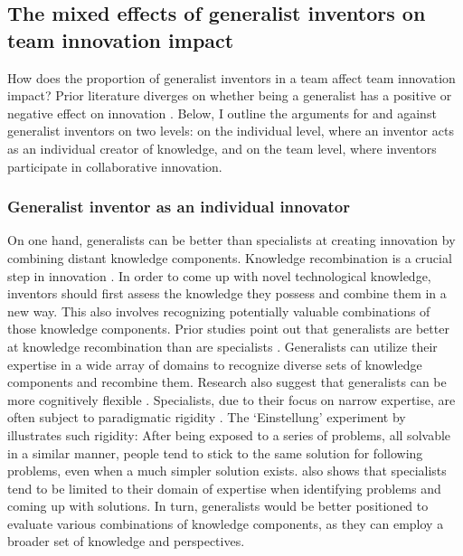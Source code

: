 \documentclass{article}
\begin{document}
\subsection{The mixed effects of generalist inventors on team innovation impact}
How does the proportion of generalist inventors in a team affect team innovation impact? Prior literature diverges on whether being a generalist has a positive or negative effect on innovation \autocite{Nagle2020,Teodoridis2019,Leahey2007,Leahey2017,Boh2014,Dane2010,Conti2014}.
Below, I outline the arguments for and against generalist inventors on two levels: on the individual level, where an inventor acts as an individual creator of knowledge, and on the team level, where inventors participate in collaborative innovation.

\subsubsection{Generalist inventor as an individual innovator}
On one hand, generalists can be better than specialists at creating innovation by combining distant knowledge components. Knowledge recombination is a crucial step in innovation \autocite{Ahuja2001,Hargadon2002}. In order to come up with novel technological knowledge, inventors should first assess the knowledge they possess and combine them in a new way. This also involves recognizing potentially valuable combinations of those knowledge components.
Prior studies point out that generalists are better at knowledge recombination than are specialists \autocite{Nagle2020,Melero2015}. Generalists can utilize their expertise in a wide array of domains to recognize diverse sets of knowledge components and recombine them.
Research also suggest that generalists can be more cognitively flexible \autocite{Luchins1942,Bilalic2008,Chai2017,Audia2007}. Specialists, due to their focus on narrow expertise, are often subject to paradigmatic rigidity \autocite{Chai2017,Audia2007}. The `Einstellung' experiment by \textcite{Luchins1942} illustrates such rigidity: After being exposed to a series of problems, all solvable in a similar manner, people tend to stick to the same solution for following problems, even when a much simpler solution exists. \textcite{Toh2014} also shows that specialists tend to be limited to their domain of expertise when identifying problems and coming up with solutions. In turn, generalists would be better positioned to evaluate various combinations of knowledge components, as they can employ a broader set of knowledge and perspectives.
\end{document}

